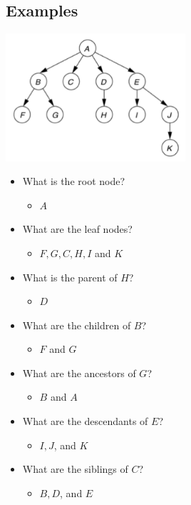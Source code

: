 \documentclass[10pt]{article}
\begin{document}
\subsection*{Examples}
\begin{center}
    \includegraphics[width = 0.5\textwidth]{images/img00006}
\end{center}
\begin{itemize}
    \item What is the root node?
    \begin{itemize}
        \item $A$
    \end{itemize}
    \item What are the leaf nodes?
    \begin{itemize}
        \item $F,G,C,H,I$ and $K$
    \end{itemize}
    \item What is the parent of $H$?
    \begin{itemize}
        \item $D$
    \end{itemize}
    \item What are the children of $B$?
    \begin{itemize}
        \item $F$ and $G$
    \end{itemize}
    \item What are the ancestors of $G$?
    \begin{itemize}
        \item $B$ and $A$
    \end{itemize}
    \item What are the descendants of $E$?
    \begin{itemize}
        \item $I,J$, and $K$
    \end{itemize}
    \item What are the siblings of $C$?
    \begin{itemize}
        \item $B,D$, and $E$
    \end{itemize}
\end{itemize}
\end{document}
